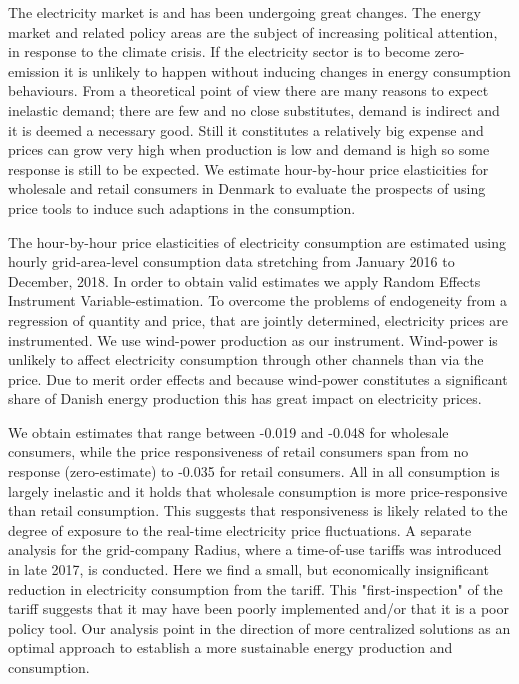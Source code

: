 \label{sec:conclusion}
The electricity market is and has been undergoing great changes. The energy market and related policy areas are the subject of increasing political attention, in response to the climate crisis. If the electricity sector is to become zero-emission it is unlikely to happen without inducing changes in energy consumption behaviours. From a theoretical point of view there are many reasons to expect inelastic demand; there are few and no close substitutes, demand is indirect and it is deemed a necessary good. Still it constitutes a relatively big expense and prices can grow very high when production is low and demand is high so some response is still to be expected. We estimate hour-by-hour price elasticities for wholesale and retail consumers in Denmark to evaluate the prospects of using price tools to induce such adaptions in the consumption. \bigskip \par
The hour-by-hour price elasticities of electricity consumption are estimated using hourly grid-area-level consumption data stretching from January 2016 to December, 2018. In order to obtain valid estimates we apply Random Effects Instrument Variable-estimation. To overcome the problems of endogeneity from a regression of quantity and price, that are jointly determined, electricity prices are instrumented. We use wind-power production as our instrument. Wind-power is unlikely to affect electricity consumption through other channels than via the price. Due to merit order effects and because wind-power constitutes a significant share of Danish energy production this has great impact on electricity prices.\bigskip \par \vspace{-1.5mm}
We obtain estimates that range between -0.019 and -0.048 for wholesale consumers, while the price responsiveness of retail consumers span from no response (zero-estimate) to -0.035 for retail consumers.  All in all consumption is largely inelastic and it holds that wholesale consumption is more price-responsive than retail consumption. This suggests that responsiveness is likely related to the degree of exposure to the real-time electricity price fluctuations. A separate analysis for the grid-company Radius,  where a time-of-use tariffs was introduced in late 2017, is conducted. Here we find a small, but economically insignificant reduction in electricity consumption from the tariff. This "first-inspection" of the tariff suggests that it may have been poorly implemented and/or that it is a poor policy tool. Our analysis point in the direction of more centralized solutions as an optimal approach to establish a more sustainable energy production and consumption. 
\begin{comment}

Literature in this field is quite large but there is still substantial room for improvement, especially within the field of estimating hour-by-hour responses at the micro-level to capture heterogeneity in this aspect.
\end{comment}